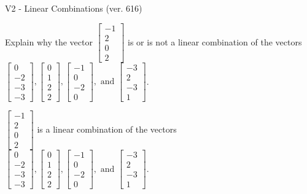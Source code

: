 \begin{exercise}
  \begin{exerciseTitle}V2 - Linear Combinations (ver. 616)\end{exerciseTitle}
  \begin{exerciseStatement}
    Explain why the vector \(\left[\begin{array}{c}
-1 \\
2 \\
0 \\
2
\end{array}\right]\)  is or is not a linear 
	combination of the vectors \(\left[\begin{array}{c}
0 \\
-2 \\
-3 \\
-3
\end{array}\right] , \left[\begin{array}{c}
0 \\
1 \\
2 \\
2
\end{array}\right] , \left[\begin{array}{c}
-1 \\
0 \\
-2 \\
0
\end{array}\right] , \text{ and } \left[\begin{array}{c}
-3 \\
2 \\
-3 \\
1
\end{array}\right]\).
	


  \end{exerciseStatement}
  \begin{exerciseAnswer}
   \(\left[\begin{array}{c}
-1 \\
2 \\
0 \\
2
\end{array}\right]\) 
  	 is  
	a linear combination of the vectors \(\left[\begin{array}{c}
0 \\
-2 \\
-3 \\
-3
\end{array}\right] , \left[\begin{array}{c}
0 \\
1 \\
2 \\
2
\end{array}\right] , \left[\begin{array}{c}
-1 \\
0 \\
-2 \\
0
\end{array}\right] , \text{ and } \left[\begin{array}{c}
-3 \\
2 \\
-3 \\
1
\end{array}\right]\).


\end{exerciseAnswer}
\end{exercise}
